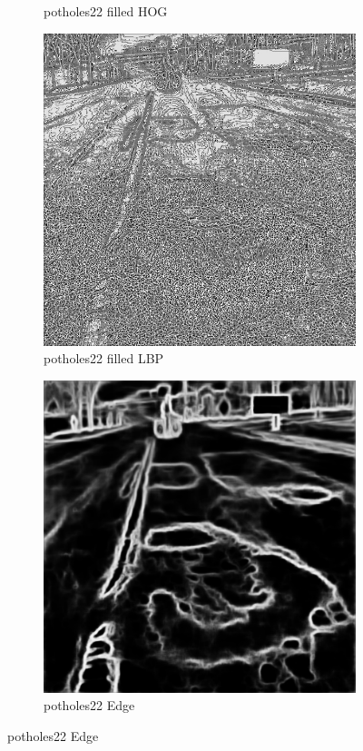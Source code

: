 \documentclass[a4paper, 10pt]{article}
\begin{document}
\begin{figure}[htbp]
\begin{subfigure}{0.24\textwidth}
			\caption*{potholes22 filled HOG}
			\label{fig: potholes22 filled HOG}
		\end{subfigure}	
		\begin{subfigure}{0.24\textwidth}
			\includegraphics[width=\linewidth]{picture/alldata_filled_lbp/potholes22}
			\caption*{potholes22 filled LBP}
			\label{fig: potholes22 filled LBP}
		\end{subfigure}
		\begin{subfigure}{0.24\textwidth}
			\includegraphics[width=\linewidth]{picture/alldata_filled_edge/potholes22}
			\caption*{potholes22 Edge}
			\label{fig: potholes22  filledEdge}
		\end{subfigure} 
		

\end{figure}
\end{document}
